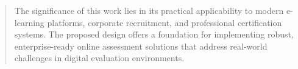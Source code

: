 \begin{abstract}
The significance of this work lies in its practical applicability to modern e-learning platforms, corporate recruitment, and professional certification systems. The proposed design offers a foundation for implementing robust, enterprise-ready online assessment solutions that address real-world challenges in digital evaluation environments.
\end{abstract}